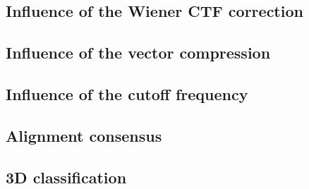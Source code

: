 \documentclass[../main.tex]{subfiles}
\begin{document}
\subsection{Influence of the Wiener CTF correction}


\subsection{Influence of the vector compression}


\subsection{Influence of the cutoff frequency}


\subsection{Alignment consensus}


\subsection{3D classification}

\end{document}
